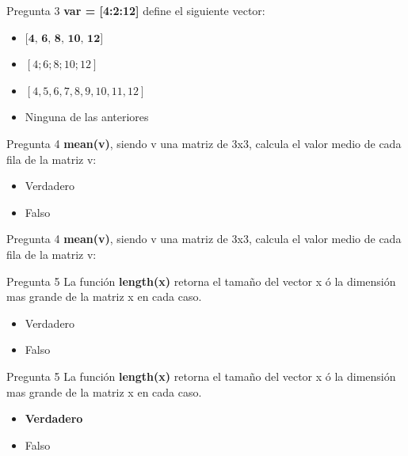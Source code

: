 \documentclass{bredelebeamer}
\begin{document}
\begin{frame}{Pregunta 3}
\textbf{var = [4:2:12]} define el siguiente vector:
\begin{itemize}
\item $\textbf{[4, 6, 8, 10, 12]}$
\item $[4; 6; 8; 10; 12]$
\item $[4,5,6,7,8,9,10,11,12]$
\item Ninguna de las anteriores
\end{itemize}
\end{frame}

\begin{frame}{Pregunta 4}
\textbf{mean(v)}, siendo v una matriz de 3x3, calcula el valor medio de cada fila de la matriz v:
\begin{itemize}
\item Verdadero
\item Falso
\end{itemize}
\end{frame}

\begin{frame}{Pregunta 4}
\textbf{mean(v)}, siendo v una matriz de 3x3, calcula el valor medio de cada fila de la matriz v:
\end{frame}

\begin{frame}{Pregunta 5}
La función \textbf{length(x)} retorna el tamaño del vector x ó la dimensión mas grande de la matriz x en cada caso.
\begin{itemize}
\item Verdadero
\item Falso
\end{itemize}
\end{frame}

\begin{frame}{Pregunta 5}
La función \textbf{length(x)} retorna el tamaño del vector x ó la dimensión mas grande de la matriz x en cada caso.
\begin{itemize}
\item \textbf{Verdadero}
\item Falso
\end{itemize}
\end{frame}
\end{document}

